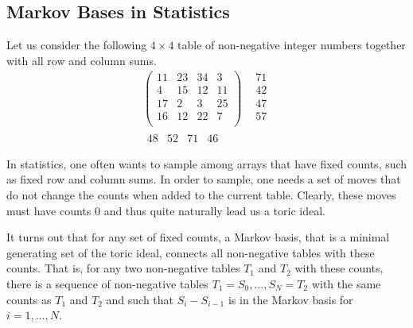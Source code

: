 \documentclass[12pt]{article}
\theoremstyle{definition}
\begin{document}
\subsection{Markov Bases in Statistics}
Let us consider the following $4\times 4$ table of non-negative
integer numbers together with all row and column sums.
\[
\begin{array}{cc}
\left(
\begin{array}{rrrr}
11 & 23 & 34 &  3\\
 4 & 15 & 12 & 11\\
17 &  2 &  3 & 25\\
16 & 12 & 22 &  7\\
\end{array}
\right)
& 
\begin{array}{r}
71\\
42\\
47\\
57\\
\end{array}\\
\begin{array}{rrrr}
48 & 52 & 71 & 46\\
\end{array} & \\
\end{array}
\]
In statistics, one often wants to sample among arrays that have fixed
counts, such as fixed row and column sums. In order to sample, one
needs a set of moves that do not change the counts when added to the
current table. Clearly, these moves must have counts $0$ and thus
quite naturally lead us a toric ideal. 

It turns out that for any set of fixed counts, a Markov
basis, that is a minimal generating set of the toric ideal, connects
all non-negative tables with these counts. That is, for any two non-negative
tables $T_1$ and $T_2$ with these counts, there is a sequence of non-negative
tables $T_1=S_0,\ldots, S_N=T_2$ with the same counts as $T_1$ and
$T_2$ and such that $S_i-S_{i-1}$ is in the Markov basis for
$i=1,\ldots, N$.
\end{document}

